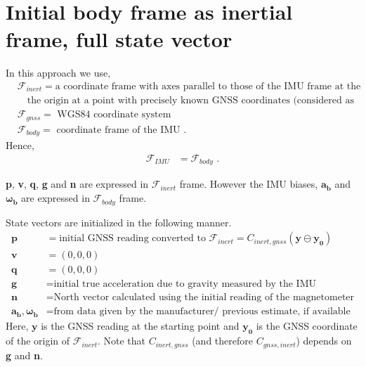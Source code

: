 \documentclass{article}
\begin{document}
\section{Initial body frame as inertial frame, full state vector}

In this approach we use,
\begin{align}
    &\mathcal{F}_{inert}=\text{a coordinate frame with axes parallel to those of the IMU frame at the initialization, and} \nonumber \\
    &\quad \text{the origin at a point with precisely known GNSS coordinates (considered as an inertial frame)} \nonumber \\
    &\mathcal{F}_{gnss}=\text{ WGS84 coordinate system} \nonumber \\
    &\mathcal{F}_{body}=\text{ coordinate frame of the IMU} \text{ .}
\end{align}{}
Hence,
\begin{align}
    \mathcal{F}_{IMU}&=\mathcal{F}_{body} \text{ .}
\end{align}{}

\textbf{p}, \textbf{v}, \textbf{q}, \textbf{g} and \textbf{n} are expressed in $\mathcal{F}_{inert}$ frame. However the IMU biases, $\boldsymbol{a_b}$ and $\boldsymbol{\omega_b}$ are expressed in $\mathcal{F}_{body}$ frame.

State vectors are initialized in the following manner.
\begin{align}
    \textbf{p}&=\text{initial GNSS reading converted to }\mathcal{F}_{inert} = C_{inert,gnss}\left(\boldsymbol{y}\ominus\boldsymbol{y_0}\right) \\
    \textbf{v}&=\left(0,0,0\right) \\
    \textbf{q}&=\left(0,0,0\right)\\
    \textbf{g}&=\text{initial true acceleration due to gravity measured by the IMU} \\
    \textbf{n}&=\text{North vector calculated using the initial reading of the magnetometer} \\
    \boldsymbol{a_b},\boldsymbol{\omega_b}&=\text{from data given by the manufacturer/ previous estimate, if available}
\end{align}{}
Here, $\boldsymbol{y}$ is the GNSS reading at the starting point and $\boldsymbol{y_0}$ is the GNSS coordinate of the origin of $\mathcal{F}_{inert}$. Note that $C_{inert,gnss}$ (and therefore $C_{gnss,inert}$) depends on \textbf{g} and \textbf{n}.
\end{document}
